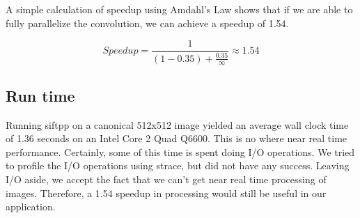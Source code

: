 A simple calculation of speedup using Amdahl's Law shows that if we are able to fully parallelize the convolution, we can achieve a speedup of 1.54. 

\begin{equation*}
Speedup =\frac{1}{(1-0.35) + \frac{0.35}{\infty}} \approx 1.54
\end{equation*}

\subsection{Run time}
Running siftpp on a canonical 512x512 image yielded an average wall clock time of 1.36 seconds on an Intel Core 2 Quad Q6600. This is no where near real time performance. Certainly, some of this time is spent doing I/O operations. We tried to profile the I/O operations using strace, but did not have any success. Leaving I/O aside, we accept the fact that we can't get near real time processing of images. Therefore, a 1.54 speedup in processing would still be useful in our application.
